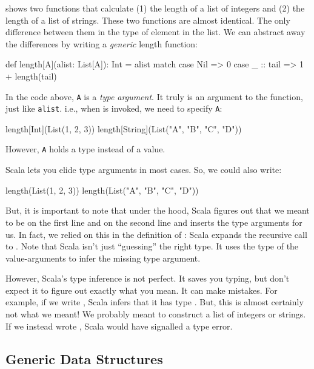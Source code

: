 \documentclass[9pt]{extbook}
\begin{document}
 shows two functions that calculate (1) the length of a list
of integers and (2) the length of a list of strings. These two functions
are almost identical. The only difference between them in the type of
element in the list. We can abstract away the differences by writing
a \emph{generic} length function:
%
\begin{scalacode}
def length[A](alist: List[A]): Int = alist match {
  case Nil => 0
  case _ :: tail => 1 + length(tail)
}
\end{scalacode}

In the code above, \verb|A| is a \emph{type argument}. It truly is an argument
to the function, just like \verb|alist|. i.e., when  is
invoked, we need to specify \verb|A|:
%
\begin{scalacode}
length[Int](List(1, 2, 3))
length[String](List("A", "B", "C", "D"))
\end{scalacode}
%
However, \verb|A| holds a type instead of a value.

Scala lets you elide type arguments in most cases. So, we could also write:
%
\begin{scalacode}
length(List(1, 2, 3))
length(List("A", "B", "C", "D"))
\end{scalacode}
%
But, it is important to note that under the hood, Scala figures out that we
meant  to be  on the first line and
 on the second line and inserts the type arguments for us.
In fact, we relied on this in the definition of : Scala
expands the recursive call  to
. Note that Scala isn't just ``guessing'' the
right type. It uses the type of the value-arguments to infer the missing
type argument.

However, Scala's type inference is not perfect. It saves you typing, but don't
expect it to figure out exactly what you mean. It can make mistakes.
For example, if we write , Scala infers
that it has type . But, this is almost certainly
not what we meant! We probably meant to construct a list of integers
or strings. If we instead wrote , Scala
would have signalled a type error.

\subsection{Generic Data Structures}
\end{document}
